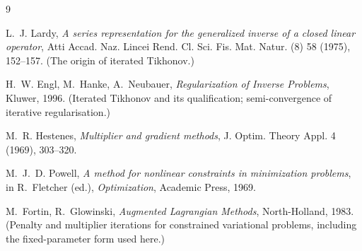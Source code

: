 \documentclass[11pt]{article}
\begin{document}
\begin{thebibliography}{9}

L.~J. Lardy,
\emph{A series representation for the generalized inverse of a closed
linear operator},
Atti Accad. Naz. Lincei Rend. Cl. Sci. Fis. Mat. Natur. (8) 58 (1975),
152--157.
(The origin of iterated Tikhonov.)

H.~W. Engl, M.~Hanke, A.~Neubauer,
\emph{Regularization of Inverse Problems},
Kluwer, 1996. (Iterated Tikhonov and its qualification; semi-convergence
of iterative regularisation.)

M.~R. Hestenes,
\emph{Multiplier and gradient methods},
J. Optim. Theory Appl. 4 (1969), 303--320.

M.~J.~D. Powell,
\emph{A method for nonlinear constraints in minimization problems},
in R.~Fletcher (ed.), \emph{Optimization}, Academic Press, 1969.

M.~Fortin, R.~Glowinski,
\emph{Augmented Lagrangian Methods},
North-Holland, 1983. (Penalty and multiplier iterations for constrained
variational problems, including the fixed-parameter form used here.)

\end{thebibliography}
\end{document}
